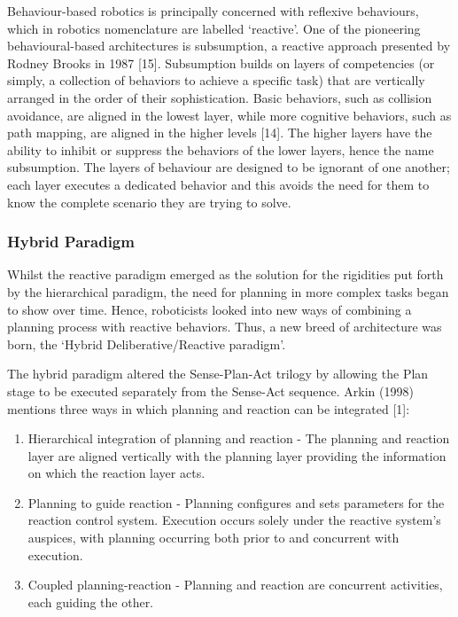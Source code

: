 \documentclass{article}
\begin{document}
\begin{multicols}{2}
Behaviour-based robotics is principally concerned with reflexive behaviours, which in robotics nomenclature are labelled ‘reactive’. One of the pioneering behavioural-based architectures is subsumption, a reactive approach presented by Rodney Brooks in 1987 [15]. Subsumption builds on layers of competencies (or simply, a collection of behaviors to achieve a specific task) that are vertically arranged in the order of their sophistication. Basic behaviors, such as collision avoidance, are aligned in the lowest layer, while more cognitive behaviors, such as path mapping, are aligned in the higher levels [14]. The higher layers have the ability to inhibit or suppress the behaviors of the lower layers, hence the name subsumption. The layers of behaviour are designed to be ignorant of one another; each layer executes a dedicated behavior and this avoids the need for them to know the complete scenario they are trying to solve.

	\subsubsection{Hybrid Paradigm}
	Whilst the reactive paradigm emerged as the solution for the rigidities put forth by the hierarchical paradigm, the need for planning in more complex tasks began to show over time. Hence, roboticists looked into new ways of combining a planning process with reactive behaviors. Thus, a new breed of architecture was born, the ‘Hybrid Deliberative/Reactive paradigm’. 

The hybrid paradigm altered the Sense-Plan-Act trilogy by allowing the Plan stage to be executed separately from the Sense-Act sequence. Arkin (1998) mentions three ways in which planning and reaction can be integrated [1]:
\begin{enumerate}
\item Hierarchical integration of planning and reaction - The planning and reaction layer are aligned vertically with the planning layer providing the information on which the reaction layer acts.

\item Planning to guide reaction - Planning configures and sets parameters for the reaction control system. Execution occurs solely under the reactive system's auspices, with planning occurring both prior to and concurrent with execution.

\item Coupled planning-reaction - Planning and reaction are concurrent activities, each guiding the other.
\end{enumerate}


\end{multicols}
\end{document}
